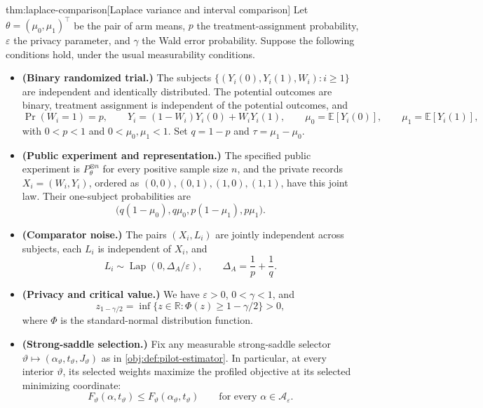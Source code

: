 \begin{theoremv}{thm:laplace-comparison}[Laplace variance and interval comparison]
Let \(\theta=(\mu_0,\mu_1)^\top\) be the pair of arm means, \(p\) the treatment-assignment probability, \(\varepsilon\) the privacy parameter, and \(\gamma\) the Wald error probability. Suppose the following conditions hold, under the usual measurability conditions.
\begin{itemize}
\item \textbf{(Binary randomized trial.)} The subjects \(\{(Y_i(0),Y_i(1),W_i):i\ge1\}\) are independent and identically distributed. The potential outcomes are binary, treatment assignment is independent of the potential outcomes, and
\[
\Pr(W_i=1)=p,\qquad
Y_i=(1-W_i)Y_i(0)+W_iY_i(1),\qquad
\mu_0=\mathbb E[Y_i(0)],\qquad
\mu_1=\mathbb E[Y_i(1)],
\]
with \(0<p<1\) and \(0<\mu_0,\mu_1<1\). Set \(q=1-p\) and \(\tau=\mu_1-\mu_0\).
\item \textbf{(Public experiment and representation.)} The specified public experiment is \(P_\theta^{\otimes n}\) for every positive sample size \(n\), and the private records \(X_i=(W_i,Y_i)\), ordered as \((0,0),(0,1),(1,0),(1,1)\), have this joint law. Their one-subject probabilities are
\[
\bigl(q(1-\mu_0),q\mu_0,p(1-\mu_1),p\mu_1\bigr).
\]
\item \textbf{(Comparator noise.)} The pairs \((X_i,L_i)\) are jointly independent across subjects, each \(L_i\) is independent of \(X_i\), and
\[
L_i\sim\operatorname{Lap}(0,\Delta_A/\varepsilon),
\qquad
\Delta_A=\frac1p+\frac1q.
\]
\item \textbf{(Privacy and critical value.)} We have \(\varepsilon>0\), \(0<\gamma<1\), and
\[
z_{1-\gamma/2}
=\inf\{z\in\mathbb R:\Phi(z)\ge1-\gamma/2\}>0,
\]
where \(\Phi\) is the standard-normal distribution function.
\item \textbf{(Strong-saddle selection.)} Fix any measurable strong-saddle selector
\(\vartheta\mapsto(\alpha_\vartheta,t_\vartheta,J_\vartheta)\)
as in \cref{obj:def:pilot-estimator}. In particular, at every interior \(\vartheta\), its selected weights maximize the profiled objective at its selected minimizing coordinate:
\[
F_\vartheta(\alpha,t_\vartheta)
\le F_\vartheta(\alpha_\vartheta,t_\vartheta)
\qquad\text{for every }\alpha\in\mathcal A_\varepsilon.
\]
\end{itemize}


\end{theoremv}
